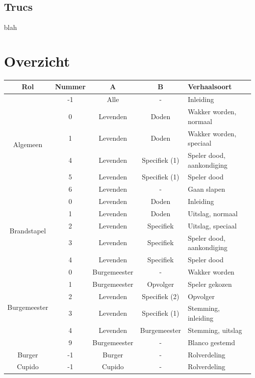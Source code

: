 \documentclass[12pt]{article}
\begin{document}
  \subsection{Trucs}
    
      blah

\section{Overzicht}

  \begin{center}
    \begin{longtable}{c|c|c|c|l}
      Rol & Nummer & A & B &Verhaalsoort \\
      \hline
      \hline
      \multirow{6}{*}{Algemeen} & -1 & Alle & - & Inleiding \\
       & 0 & Levenden & Doden & Wakker worden, normaal \\
       & 1 & Levenden & Doden & Wakker worden, speciaal \\
       & 4 & Levenden & Specifiek (1) & Speler dood, aankondiging \\
       & 5 & Levenden & Specifiek (1) & Speler dood \\
       & 6 & Levenden & - & Gaan slapen \\
      \hline
      \multirow{5}{*}{Brandstapel} & 0 & Levenden & Doden & Inleiding \\
       & 1 & Levenden & Doden & Uitslag, normaal \\
       & 2 & Levenden & Specifiek & Uitslag, speciaal \\
       & 3 & Levenden & Specifiek & Speler dood, aankondiging \\
       & 4 & Levenden & Specifiek & Speler dood \\
      \hline
      \multirow{6}{*}{Burgemeester} & 0 & Burgemeester & - & Wakker worden \\
       & 1 & Burgemeester & Opvolger & Speler gekozen \\
       & 2 & Levenden & Specifiek (2) & Opvolger \\
       & 3 & Levenden & Specifiek (1) & Stemming, inleiding \\
       & 4 & Levenden & Burgemeester & Stemming, uitslag \\
       & 9 & Burgemeester & - & Blanco gestemd \\
      \hline
      \multirow{1}{*}{Burger} & -1 & Burger & - & Rolverdeling \\
      \hline
      \multirow{8}{*}{Cupido} & -1 & Cupido & - & Rolverdeling \\

\end{longtable}
\end{center}
\end{document}

